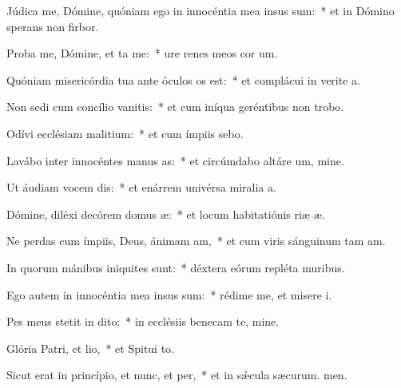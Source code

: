 \item Júdica me, Dómine, quóniam ego in innocéntia mea insus sum:~* et in Dómino sperans non firbor.
\item Proba me, Dómine, et ta me:~* ure renes meos  cor um.
\item Quóniam misericórdia tua ante óculos os est:~* et complácui in verite a.
\item Non sedi cum concílio vanitis:~* et cum iníqua geréntibus non trobo.
\item Odívi ecclésiam malitium:~* et cum ímpiis  sebo.
\item Lavábo inter innocéntes manus as:~* et circúmdabo altáre um, mine.
\item Ut áudiam vocem dis:~* et enárrem univérsa miralia a.
\item Dómine, diléxi decórem domus æ:~* et locum habitatiónis riæ æ.
\item Ne perdas cum ímpiis, Deus, ánimam am,~* et cum viris sánguinum tam am.
\item In quorum mánibus iniquites sunt:~* déxtera eórum repléta  muribus.
\item Ego autem in innocéntia mea insus sum:~* rédime me, et misere i.
\item Pes meus stetit in dito:~* in ecclésiis benecam te, mine.
\item Glória Patri, et lio,~* et Spitui to.
\item Sicut erat in princípio, et nunc, et per,~* et in sǽcula sæcurum. men.
